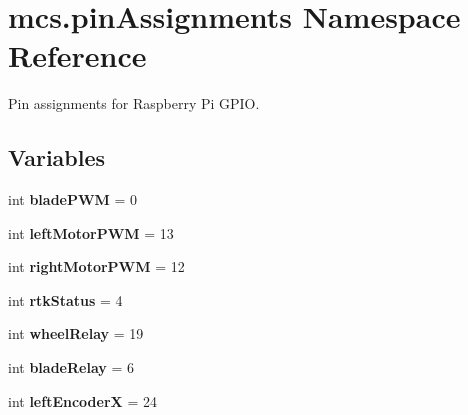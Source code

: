 \hypertarget{namespacemcs_1_1pinAssignments}{}\section{mcs.\+pin\+Assignments Namespace Reference}
\label{namespacemcs_1_1pinAssignments}


Pin assignments for Raspberry Pi G\+P\+IO.  


\subsection*{Variables}
\begin{DoxyCompactItemize}
\item 
\mbox{\label{namespacemcs_1_1pinAssignments_a9d3ec8228abf892aa42982ad01b54d06}} 
int {\bfseries blade\+P\+WM} = 0
\item 
\mbox{\label{namespacemcs_1_1pinAssignments_afb69e778d9bb6124800c776676222848}} 
int {\bfseries left\+Motor\+P\+WM} = 13
\item 
\mbox{\label{namespacemcs_1_1pinAssignments_ab28afc142b09850bae4964c45cc5b514}} 
int {\bfseries right\+Motor\+P\+WM} = 12
\item 
\mbox{\label{namespacemcs_1_1pinAssignments_a40cdb5b1b8a2f51cccacebdcc82681bc}} 
int {\bfseries rtk\+Status} = 4
\item 
\mbox{\label{namespacemcs_1_1pinAssignments_a3a3dcc73c8eb1cf6169bad13667f444f}} 
int {\bfseries wheel\+Relay} = 19
\item 
\mbox{\label{namespacemcs_1_1pinAssignments_a96ccaf01ead67d7cf93798c74b4ff5fe}} 
int {\bfseries blade\+Relay} = 6
\item 
\mbox{\label{namespacemcs_1_1pinAssignments_ab16fed7bac14ab4bb5135e65d7a4b28c}} 
int {\bfseries left\+EncoderX} = 24
\item 
\mbox{\label{namespacemcs_1_1pinAssignments_a2747e63da8f4a99e4d1f053a0af723d6}} 

\end{DoxyCompactItemize}
